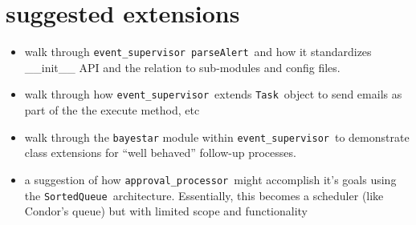 \documentclass{article}
\newcommand{\parseAlert}{\texttt{parseAlert}~}
\newcommand{\SortedQueue}{\texttt{SortedQueue}~}
\newcommand{\Task}{\texttt{Task}~}
\newcommand{\approvalProcessor}{\texttt{approval\_processor}~}
\newcommand{\eventSupervisor}{\texttt{event\_supervisor}~}
\begin{document}

\section{suggested extensions}
\label{sec: suggested extensions}

\begin{itemize}
    \item{walk through \eventSupervisor \parseAlert and how it standardizes \_\_init\_\_ API and the relation to sub-modules and config files.}
    \item{walk through how \eventSupervisor extends \Task object to send emails as part of the the execute method, etc}
    \item{walk through the \texttt{bayestar} module within \eventSupervisor to demonstrate class extensions for ``well behaved'' follow-up processes.}
    \item{a suggestion of how \approvalProcessor might accomplish it's goals using the \SortedQueue architecture. Essentially, this becomes a scheduler (like Condor's queue) but with limited scope and functionality}
\end{itemize}

\end{document}
